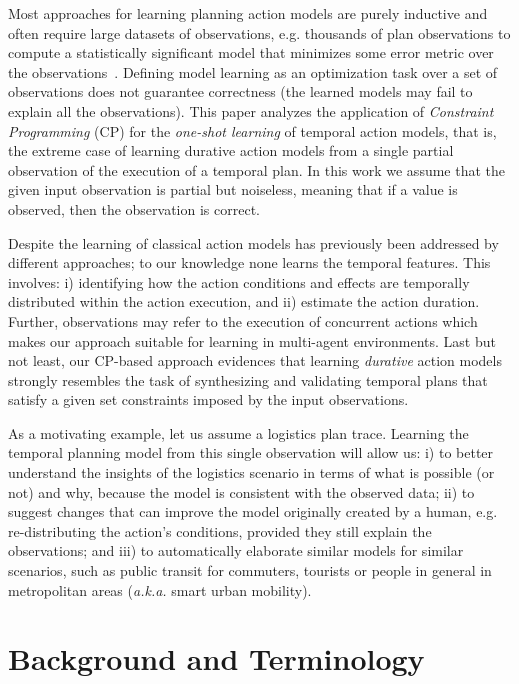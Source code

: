 \documentclass[runningheads]{llncs}
\begin{document}
Most approaches for learning planning action models are purely inductive and often require large datasets of observations, e.g. thousands of plan observations to compute a statistically significant model that minimizes some error metric over the observations~\cite{kuvcera2018louga,MouraoZPS12,yang2007learning,zhuo2013action}. Defining model learning as an optimization task over a set of observations does not guarantee correctness (the learned models may fail to explain all the observations). This paper analyzes the application of {\em Constraint Programming} (CP) for the {\em one-shot learning} of temporal action models, that is, the extreme case of learning durative action models from a single partial observation of the execution of a temporal plan. In this work we assume that the given input observation is partial but noiseless, meaning that if a value is observed, then the observation is correct.

Despite the learning of classical action models has previously been addressed by different approaches; to our knowledge none learns the temporal features. This involves: i) identifying how the action conditions and effects are temporally distributed within the action execution, and ii) estimate the action duration. Further, observations may refer to the execution of concurrent actions which makes our approach suitable for learning in multi-agent environments. Last but not least, our CP-based approach evidences that learning {\em durative} action models strongly resembles the task of synthesizing and validating temporal plans that satisfy a given set constraints imposed by the input observations. 

As a motivating example, let us assume a logistics plan trace. Learning the temporal planning model from this single observation will allow us: i) to better understand the insights of the logistics scenario in terms of what is possible (or not) and why, because the model is consistent with the observed data; ii) to suggest changes that can improve the model originally created by a human, e.g. re-distributing the action's conditions, provided they still explain the observations; and iii) to automatically elaborate similar models for similar scenarios, such as public transit for commuters, tourists or people in general in metropolitan areas (\emph{a.k.a.} smart urban mobility).



\section{Background and Terminology}
\label{sec:background}
\end{document}
